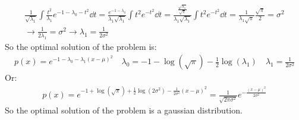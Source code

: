 \documentclass[12pt]{article}
\begin{document}
\begin{qsolve}[solution]
    \begin{align*}
        \frac{1}{\sqrt{\lambda_1}} \int \frac{t^2}{\lambda_1} e^{-1-\lambda_0-t^2} \dd{t} = \frac{e^{-1-\lambda_0}}{\lambda_1 \sqrt{\lambda_1}} \int t^2 e^{-t^2} \dd{t} = \frac{\frac{\sqrt{\lambda_1}}{\sqrt{\pi}}}{\lambda_1 \sqrt{\lambda_1}} \int t^2 e^{-t^2} \dd{t} = \frac{1}{\lambda_1 \sqrt{\pi}} \frac{\sqrt{\pi}}{2} = \sigma^2 \\
        \rightarrow \frac{1}{2\lambda_1} = \sigma^2 \rightarrow \lambda_1 = \frac{1}{2\sigma^2}
    \end{align*}
    So the optimal solution of the problem is:
    \begin{align*}
        p(x) = e^{-1-\lambda_0-\lambda_1(x-\mu)^2} \quad \lambda_0 = -1 - \log(\sqrt{\pi}) - \frac{1}{2}\log(\lambda_1) \quad \lambda_1 = \frac{1}{2\sigma^2}
    \end{align*}
    Or:
    \begin{align*}
        p(x) = e^{-1+\log(\sqrt{\pi}) + \frac{1}{2}\log(2\sigma^2) - \frac{1}{2\sigma^2}(x-\mu)^2} = \frac{1}{\sqrt{2\pi\sigma^2}} e^{-\frac{(x-\mu)^2}{2\sigma^2}}
    \end{align*}
    So the optimal solution of the problem is a gaussian distribution.
\end{qsolve}



\makeendpage
\end{document}

